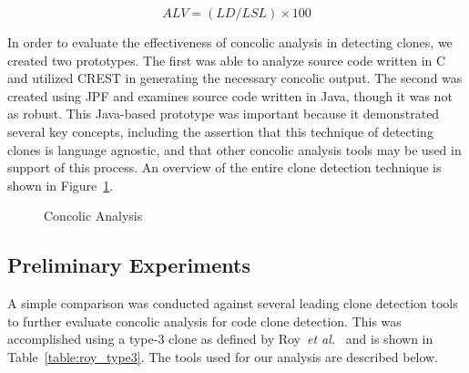 \documentclass[smallextended]{svjour3}       %
\begin{document}
\begin{equation} \label{eq:avglevenformula}
ALV = (LD/LSL) \times 100
\end{equation}

In order to evaluate the effectiveness of concolic analysis in detecting clones, we created two prototypes. The first was able to analyze source code written in C and utilized CREST in generating the necessary concolic output. The second was created using JPF and examines source code written in Java, though it was not as robust. This Java-based prototype was important because it demonstrated several key concepts, including the assertion that this technique of detecting clones is language agnostic, and that other concolic analysis tools may be used in support of this process. An overview of the entire clone detection technique is shown in Figure~\ref{fig:concolicdiscoveryprocess}.


\begin{figure}
\centering
{}
\caption{Concolic Analysis} \label{fig:concolicdiscoveryprocess}
\end{figure}


\subsection{Preliminary Experiments}

A simple comparison was conducted against several leading clone detection tools to further evaluate concolic analysis for code clone detection. This was accomplished using a type-3 clone as defined by Roy~\emph{et al.}~\cite{Roy:2009:CEC:1530898.1531101} and is shown in Table~\ref{table:roy_type3}. The tools used for our analysis are described below.
\end{document}
